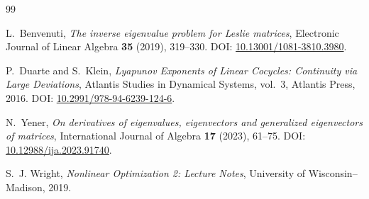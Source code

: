 \documentclass[11pt]{amsart}
\numberwithin{equation}{section}
\theoremstyle{plain}
\theoremstyle{definition}
\theoremstyle{remark}
\begin{document}
\begin{thebibliography}{99}

L.~Benvenuti,
\emph{The inverse eigenvalue problem for Leslie matrices},
Electronic Journal of Linear Algebra \textbf{35} (2019), 319--330.
DOI: \href{https://doi.org/10.13001/1081-3810.3980}{10.13001/1081-3810.3980}.

P.~Duarte and S.~Klein,
\emph{Lyapunov Exponents of Linear Cocycles: Continuity via Large Deviations},
Atlantis Studies in Dynamical Systems, vol.~3, Atlantis Press, 2016.
DOI: \href{https://doi.org/10.2991/978-94-6239-124-6}{10.2991/978-94-6239-124-6}.

N.~Yener,
\emph{On derivatives of eigenvalues, eigenvectors and generalized eigenvectors of matrices},
International Journal of Algebra \textbf{17} (2023), 61--75.
DOI: \href{https://doi.org/10.12988/ija.2023.91740}{10.12988/ija.2023.91740}.

S.~J. Wright,
\emph{Nonlinear Optimization 2: Lecture Notes},
University of Wisconsin--Madison, 2019.

\end{thebibliography}
\end{document}
